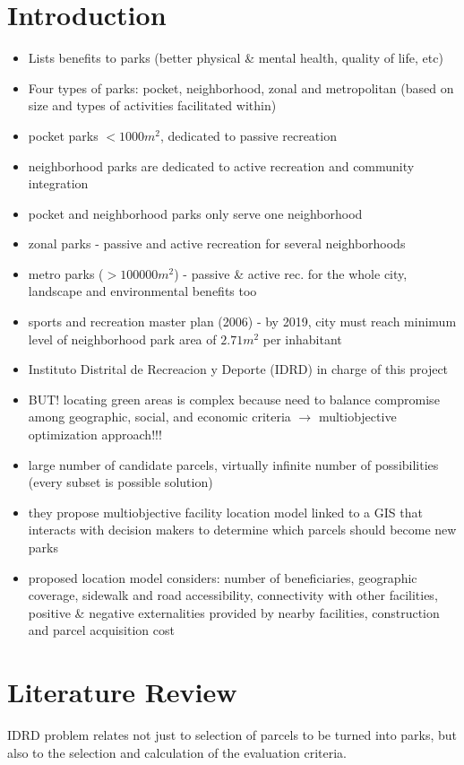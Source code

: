 \documentclass{article}
\begin{document}
\section{Introduction}
\begin{itemize}
\item Lists benefits to parks (better physical \& mental health, quality of life, etc)
\item Four types of parks: pocket, neighborhood, zonal and metropolitan (based on size and types of activities facilitated within)
\item pocket parks $ < 1000m^2$, dedicated to passive recreation
\item neighborhood parks are dedicated to active recreation and community integration
\item pocket and neighborhood parks only serve one neighborhood
\item zonal parks - passive and active recreation for several neighborhoods
\item metro parks ($> 100000m^2$) - passive \& active rec. for the whole city, landscape and environmental benefits too
\item sports and recreation master plan (2006) - by 2019, city must reach minimum level of neighborhood park area of $2.71m^2$ per inhabitant
\item Instituto Distrital de Recreacion y Deporte (IDRD) in charge of this project
\item BUT! locating green areas is complex because need to balance compromise among geographic, social, and economic criteria $\rightarrow$ multiobjective optimization approach!!!
\item large number of candidate parcels, virtually infinite number of possibilities (every subset is possible solution)
\item they propose multiobjective facility location model linked to a GIS that interacts with decision makers to determine which parcels should become new parks
\item proposed location model considers: number of beneficiaries, geographic coverage, sidewalk and road accessibility, connectivity with other facilities, positive \& negative externalities provided by nearby facilities, construction and parcel acquisition cost
\end{itemize}
%
%
\section{Literature Review}
IDRD problem relates not just to selection of parcels to be turned into parks, but also to the selection and calculation of the evaluation criteria. 
%
%
\end{document}
